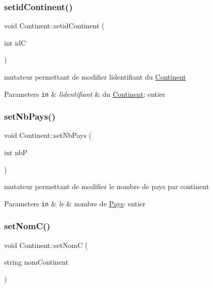 \subsubsection{\texorpdfstring{setid\+Continent()}{setidContinent()}}
{\footnotesize\ttfamily void Continent\+::setid\+Continent (\begin{DoxyParamCaption}\item[{int}]{idC }\end{DoxyParamCaption})}



mutateur permettant de modifier l\textquotesingle{}identifiant du \mbox{\hyperlink{classContinent}{Continent}} 


\begin{DoxyParams}[1]{Parameters}
\mbox{\tt in}  & {\em l\textquotesingle{}identifiant} & du \mbox{\hyperlink{classContinent}{Continent}}\+: entier \\
\hline
\end{DoxyParams}
\mbox{\label{classContinent_a888a4cf1b87c2a1343b0b22889e07ca9}} 
\subsubsection{\texorpdfstring{set\+Nb\+Pays()}{setNbPays()}}
{\footnotesize\ttfamily void Continent\+::set\+Nb\+Pays (\begin{DoxyParamCaption}\item[{int}]{nbP }\end{DoxyParamCaption})}



mutateur permettant de modifier le nombre de pays par continent 


\begin{DoxyParams}[1]{Parameters}
\mbox{\tt in}  & {\em le} & nombre de \mbox{\hyperlink{classPays}{Pays}}\+: entier \\
\hline
\end{DoxyParams}
\mbox{\label{classContinent_ae38f8aa88d22d30d2ee471b8fc2231f6}} 
\subsubsection{\texorpdfstring{set\+Nom\+C()}{setNomC()}}
{\footnotesize\ttfamily void Continent\+::set\+NomC (\begin{DoxyParamCaption}\item[{string}]{nom\+Continent }\end{DoxyParamCaption})}



